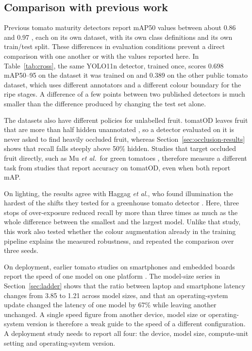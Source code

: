 \subsection{Comparison with previous work}

Previous tomato maturity detectors report mAP50 values between about 0.86 and
0.97 \cite{su2022seyolov3, li2023yolov5tomato, li2023mhsayolov8,
camacho2023tomato}, each on its own dataset, with its own class definitions and
its own train/test split. These differences in evaluation conditions prevent a
direct comparison with one another or with the values reported here. In
Table~\ref{tab:cross}, the same YOLO11n detector, trained once, scores 0.698
mAP50--95 on the dataset it was trained on and 0.389 on the other public tomato
dataset, which uses different annotators and a different colour boundary for
the ripe stages. A difference of a few points between two published detectors
is much smaller than the difference produced by changing the test set alone.

The datasets also have different policies for unlabelled fruit. tomatOD leaves
fruit that are more than half hidden unannotated \cite{tsironis2020tomatod},
so a detector evaluated on it is never asked to find heavily occluded fruit,
whereas Section~\ref{sec:occlusion-results} shows that recall falls steeply
above 50\% hidden. Studies that target occluded fruit directly, such as Mu
\emph{et al.}\ for green tomatoes \cite{mu2020occluded}, therefore measure a
different task from studies that report accuracy on tomatOD, even when both
report mAP.

On lighting, the results agree with Haggag \emph{et al.}, who found
illumination the hardest of the shifts they tested for a greenhouse tomato
detector \cite{haggag2024generalization}. Here, three stops of over-exposure
reduced recall by more than three times as much as the whole difference between
the smallest and the largest model. Unlike that study, this work also tested
whether the colour augmentation already in the training pipeline explains the
measured robustness, and repeated the comparison over three seeds.

On deployment, earlier tomato studies on smartphones and embedded boards
report the speed of one model on one platform \cite{zeng2023mobile, jia2025tseyolo,
liu2025gaeyolo, kafi2025drone}. The model-size series in
Section~\ref{sec:ladder} shows
that the ratio between laptop and smartphone latency changes from 3.85 to 1.21
across model sizes, and that an operating-system update changed the latency of
one model by 67\% while leaving another unchanged. A single speed figure from
another device, model size or operating-system version is therefore a weak
guide to the speed of a different configuration. A deployment study needs to
report all four: the device, model size, compute-unit setting and
operating-system version.
